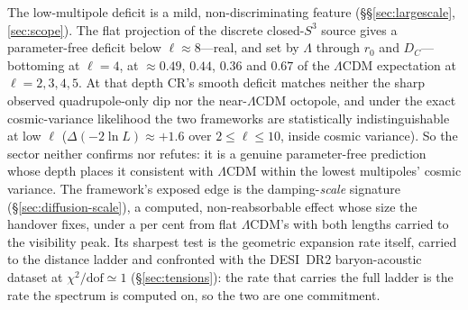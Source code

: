 \documentclass[11pt,a4paper]{article}
\theoremstyle{plain}
\theoremstyle{definition}
\theoremstyle{remark}
\begin{document}
The low-multipole deficit is a mild, non-discriminating feature (\S\S\ref{sec:largescale}, \ref{sec:scope}). The flat projection of the discrete closed-$S^3$ source gives a parameter-free deficit below $\ell\approx8$---real, and set by $\Lambda$ through $r_0$ and $D_C$---bottoming at $\ell=4$, at $\approx0.49$, $0.44$, $0.36$ and $0.67$ of the $\Lambda$CDM expectation at $\ell=2,3,4,5$. At that depth CR's smooth deficit matches neither the sharp observed quadrupole-only dip nor the near-$\Lambda$CDM octopole, and under the exact cosmic-variance likelihood the two frameworks are statistically indistinguishable at low $\ell$ ($\Delta(-2\ln L)\approx+1.6$ over $2\le\ell\le10$, inside cosmic variance). So the sector neither confirms nor refutes: it is a genuine parameter-free prediction whose depth places it consistent with $\Lambda$CDM within the lowest multipoles' cosmic variance. The framework's exposed edge is the damping-\emph{scale} signature (\S\ref{sec:diffusion-scale}), a computed, non-reabsorbable effect whose size the handover fixes, under a per cent from flat $\Lambda$CDM's with both lengths carried to the visibility peak. Its sharpest test is the geometric expansion rate itself, carried to the distance ladder and confronted with the DESI~DR2 baryon-acoustic dataset at $\chi^2/\text{dof}\simeq1$ (\S\ref{sec:tensions}): the rate that carries the full ladder is the rate the spectrum is computed on, so the two are one commitment.
\end{document}
